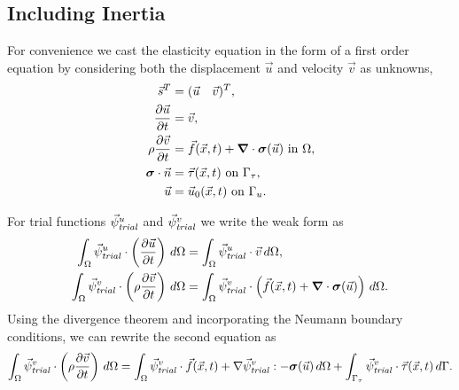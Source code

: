 \subsection{Including Inertia}

For convenience we cast the elasticity equation in the form of a first order
equation by considering both the displacement $\vec{u}$ and velocity $\vec{v}$
as unknowns,
\begin{align}
  \vec{s}^T &= (\vec{u} \quad \vec{v})^T, \\
%
  \label{eqn:velocity:strong:form}
  \frac{\partial\vec{u}}{\partial t} &= \vec{v}, \\
%
  \label{eqn:elasticity:order1:strong:form}
  \rho \frac{\partial\vec{v}}{\partial t} &= \vec{f}(\vec{x},t) + \tensor{\nabla} \cdot 
\tensor{\sigma}(\vec{u}) 
\text{ in }\Omega, \\
  \tensor{\sigma} \cdot \vec{n} &= \vec{\tau}(\vec{x},t) \text{ on }\Gamma_\tau, \\
  \vec{u} &= \vec{u}_0(\vec{x},t) \text{ on }\Gamma_u.
\end{align}

For trial functions $\trialvec[u]$ and $\trialvec[v]$ we write the weak form as
\begin{align}
  \int_\Omega \trialvec[u] \cdot \left( \frac{\partial \vec{u}}{\partial t} \right) \, d\Omega 
&= 
  \int_\Omega \trialvec[u] \cdot \vec{v} \, d\Omega, \\
%
  \int_\Omega \trialvec[v] \cdot \left( \rho \frac{\partial \vec{v}}{\partial t} \right) \, 
d\Omega &= 
  \int_\Omega \trialvec[v] \cdot \left( \vec{f}(\vec{x},t) + \tensor{\nabla} \cdot 
\tensor{\sigma}(\vec{u})  
\right) \, d\Omega.
%
\end{align}
Using the divergence theorem and incorporating the Neumann boundary
conditions, we can rewrite the second equation as
\begin{equation}
  \label{eqn:elasticity:displacement}
  \int_\Omega \trialvec[v] \cdot \left( \rho \frac{\partial \vec{v}}{\partial t} \right) \, 
d\Omega =
  \int_\Omega \trialvec[v] \cdot \vec{f}(\vec{x},t) + \nabla \trialvec[v] : -\tensor{\sigma}
(\vec{u}) \, d\Omega + 
\int_{\Gamma_\tau} \trialvec[v] \cdot \vec{\tau}(\vec{x},t) \, d\Gamma.
\end{equation}

